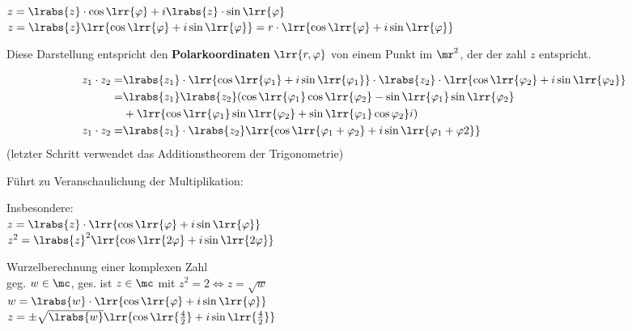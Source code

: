 			$z=\lrabs{z}\cdot\cos\lrr{\varphi}+i\lrabs{z}\cdot\sin\lrr{\varphi}$\\
			$z=\lrabs{z}\lrr{\cos\lrr{\varphi}+i\sin\lrr{\varphi}}=r\cdot\lrr{\cos\lrr{\varphi}+i\sin\lrr{\varphi}}$
			
			Diese Darstellung entspricht den \textbf{Polarkoordinaten} $\lrr{r,\varphi}$ von einem Punkt im $\mr^2$, der der zahl $z$ entspricht.
		\item \begin{align*}
				z_1\cdot z_2=&\lrabs{z_1}\cdot\lrr{\cos\lrr{\varphi_1}+i\sin\lrr{\varphi_1}}\cdot\lrabs{z_2}\cdot\lrr{\cos\lrr{\varphi_2}+i\sin\lrr{\varphi_2}}\\
				=&\lrabs{z_1}\lrabs{z_2}(\cos\lrr{\varphi_1}\cos\lrr{\varphi_2}-\sin\lrr{\varphi_1}\sin\lrr{\varphi_2}\\
				&+\lrr{\cos\lrr{\varphi_1}\sin\lrr{\varphi_2}+\sin\lrr{\varphi_1}\cos\varphi_2}i)\\
				z_1\cdot z_2=&\lrabs{z_1}\cdot\lrabs{z_2}\lrr{\cos\lrr{\varphi_1+\varphi_2}+i\sin\lrr{\varphi_1+\varphi2}}
			\end{align*}
			(letzter Schritt verwendet das Additionstheorem der Trigonometrie)
			
			Führt zu Veranschaulichung der Multiplikation:
			
			
			Insbesondere:\\
			$z=\lrabs{z}\cdot\lrr{\cos\lrr{\varphi}+i\sin\lrr{\varphi}}$\\
			$z^2=\lrabs{z}^2\lrr{\cos\lrr{2\varphi}+i\sin\lrr{2\varphi}}$
		\item Wurzelberechnung einer komplexen Zahl\\
			geg. $w\in\mc$, ges. ist $z\in\mc$ mit $z^2=2\Leftrightarrow z=\sqrt{w}$\\
			$w=\lrabs{w}\cdot\lrr{\cos\lrr{\varphi}+i\sin\lrr{\varphi}}$\\
			$z=\pm\sqrt{\lrabs{w}}\lrr{\cos\lrr{\frac{4}{2}}+i\sin\lrr{\frac{4}{2}}}$
			
